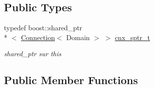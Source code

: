 \subsection*{Public Types}
\begin{DoxyCompactItemize}
\item 
typedef boost\-::shared\-\_\-ptr\\*
$<$ \hyperlink{classxtd_1_1network_1_1base_1_1Connection}{Connection}$<$ Domain $>$ $>$ \hyperlink{classxtd_1_1network_1_1base_1_1Connection_a10f05cd689d67b012768c79486c6df47}{cnx\-\_\-sptr\-\_\-t}
\begin{DoxyCompactList}\small\item\em shared\-\_\-ptr sur this \end{DoxyCompactList}\end{DoxyCompactItemize}
\subsection*{Public Member Functions}
